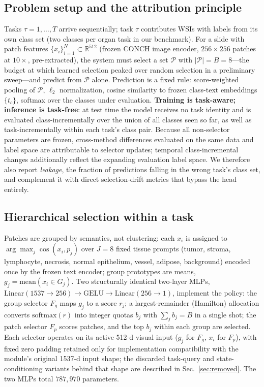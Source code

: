\documentclass{article}
\newcommand{\Fg}{F_{g}} \newcommand{\Fp}{F_{p}}
\begin{document}
\subsection{Problem setup and the attribution principle}
Tasks $\tau = 1,\dots,T$ arrive sequentially; task $\tau$ contributes WSIs with labels from its own class set (two classes per organ task in our benchmark). For a slide with patch features $\{x_i\}_{i=1}^{N}\!\subset\!\mathbb{R}^{512}$ (frozen CONCH image encoder, $256{\times}256$ patches at $10\times$, pre-extracted), the system must select a set $\mathcal{P}$ with $|\mathcal{P}| = B = 8$---the budget at which learned selection peaked over random selection in a preliminary sweep---and predict from $\mathcal{P}$ alone. Prediction is a fixed rule: score-weighted pooling of $\mathcal{P}$, $\ell_2$ normalization, cosine similarity to frozen class-text embeddings $\{t_c\}$, softmax over the classes under evaluation. \textbf{Training is task-aware; inference is task-free}: at test time the model receives no task identity and is evaluated class-incrementally over the union of all classes seen so far, as well as task-incrementally within each task's class pair. Because all non-selector parameters are frozen, cross-method differences evaluated on the same data and label space are attributable to selector updates; temporal class-incremental changes additionally reflect the expanding evaluation label space. We therefore also report \emph{leakage}, the fraction of predictions falling in the wrong task's class set, and complement it with direct selection-drift metrics that bypass the head entirely.

\subsection{Hierarchical selection within a task}
\label{ssec:hier}
Patches are grouped by semantics, not clustering: each $x_i$ is assigned to $\arg\max_j \cos(x_i, p_j)$ over $J{=}8$ fixed tissue prompts (tumor, stroma, lymphocyte, necrosis, normal epithelium, vessel, adipose, background) encoded once by the frozen text encoder; group prototypes are means, $g_j = \mathrm{mean}(x_i \in G_j)$. Two structurally identical two-layer MLPs, $\mathrm{Linear}(1537{\to}256)\to\mathrm{GELU}\to\mathrm{Linear}(256{\to}1)$, implement the policy: the group selector $\Fg$ maps $g_j$ to a score $r_j$; a largest-remainder (Hamilton) allocation converts $\mathrm{softmax}(r)$ into integer quotas $b_j$ with $\sum_j b_j = B$ in a single shot; the patch selector $\Fp$ scores patches, and the top $b_j$ within each group are selected. Each selector operates on its active 512-d visual input ($g_j$ for $\Fg$, $x_i$ for $\Fp$), with fixed zero padding retained only for implementation compatibility with the module's original 1537-d input shape; the discarded task-query and state-conditioning variants behind that shape are described in Sec.~\ref{sec:removed}. The two MLPs total $787{,}970$ parameters.
\end{document}

